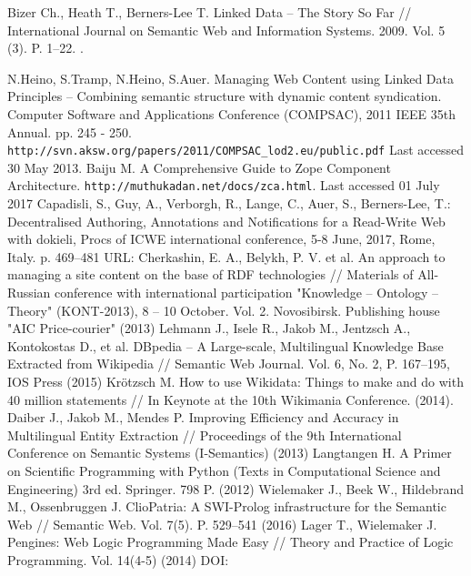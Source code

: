 \documentclass[conference,a4paper]{IEEEtran}
\providecommand\url[1]{\texttt{#1}}
\begin{document}
\begin{thebibliography}{99}
 Bizer Ch., Heath T., Berners-Lee T. Linked Data -- The Story So
  Far // International Journal on Semantic Web and Information Systems.
  2009. Vol. 5 (3). P. 1--22. .

 N.Heino, S.Tramp, N.Heino, S.Auer. Managing Web Content using Linked Data Principles – Combining semantic structure with dynamic content syndication. Computer Software and Applications Conference (COMPSAC), 2011 IEEE 35th Annual. pp. 245 - 250.  \url{http://svn.aksw.org/papers/2011/COMPSAC_lod2.eu/public.pdf}  Last accessed 30 May 2013.
  Baiju M. A Comprehensive Guide to Zope Component Architecture.
\url{http://muthukadan.net/docs/zca.html}. Last accessed 01 July 2017
  Capadisli, S., Guy, A., Verborgh, R., Lange, C., Auer, S., Berners-Lee, T.: Decentralised Authoring, Annotations and Notifications for a Read-Write Web with dokieli, Procs of ICWE international conference, 5-8 June, 2017, Rome, Italy. p. 469--481 URL: 
  Cherkashin, E. A., Belykh, P. V. et al. An approach to managing a site
  content on the base of RDF technologies // Materials of All-Russian
  conference with international participation "Knowledge -- Ontology --
  Theory" (KONT-2013), 8 -- 10 October. Vol. 2. Novosibirsk.
  Publishing house "AIC Price-courier" (2013)
  Lehmann J., Isele R., Jakob M., Jentzsch A., Kontokostas D., et al.
  DBpedia -- A Large-scale, Multilingual Knowledge Base Extracted from
  Wikipedia // Semantic Web Journal. Vol. 6, No. 2, P. 167--195,
  IOS Press (2015)
  Krötzsch M. How to use Wikidata: Things to make and do with 40 million
  statements // In Keynote at the 10th Wikimania Conference. (2014).
  Daiber J., Jakob M., Mendes P. Improving Efficiency and Accuracy in
  Multilingual Entity Extraction // Proceedings of the 9th International
  Conference on Semantic Systems (I-Semantics) (2013)
  Langtangen H. A Primer on Scientific Programming with Python (Texts in
  Computational Science and Engineering) 3rd ed. Springer. 798 P. (2012)
  Wielemaker J., Beek W., Hildebrand M., Ossenbruggen J. ClioPatria: A
  SWI-Prolog infrastructure for the Semantic Web // Semantic Web.
  Vol. 7(5). P. 529--541 (2016) 
  Lager T., Wielemaker J. Pengines: Web Logic Programming Made Easy //
  Theory and Practice of Logic Programming. Vol. 14(4-5) (2014)
DOI: 

\end{thebibliography}
\end{document}
